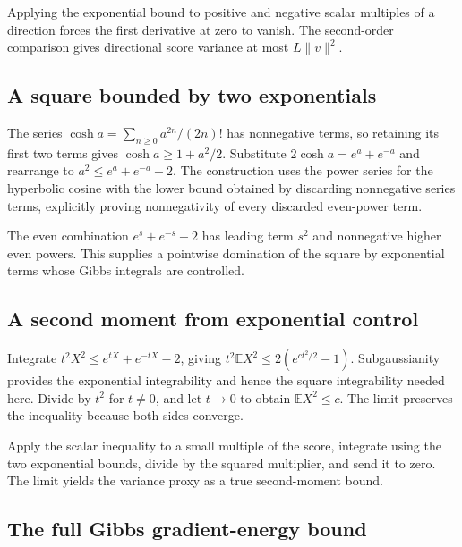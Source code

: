 \documentclass[11pt,a4paper]{article}
\begin{document}
Applying the exponential bound to positive and negative scalar multiples of a direction forces the first derivative at zero to vanish. The second-order comparison gives directional score variance at most \(L\|v\|^2\).


\subsection{\texorpdfstring{A square bounded by two exponentials}{A square bounded by two exponentials}}


The series \(\cosh a=\sum_{n\ge0}a^{2n}/(2n)!\) has nonnegative terms, so retaining its first two terms gives \(\cosh a\ge1+a^2/2\). Substitute \(2\cosh a=e^a+e^{-a}\) and rearrange to \(a^2\le e^a+e^{-a}-2\). The construction uses the power series for the hyperbolic cosine with the lower bound obtained by discarding nonnegative series terms, explicitly proving nonnegativity of every discarded even-power term.



The even combination \(e^s+e^{-s}-2\) has leading term \(s^2\) and nonnegative higher even powers. This supplies a pointwise domination of the square by exponential terms whose Gibbs integrals are controlled.


\subsection{\texorpdfstring{A second moment from exponential control}{A second moment from exponential control}}


Integrate \(t^2X^2\le e^{tX}+e^{-tX}-2\), giving \(t^2\mathbb EX^2\le2(e^{ct^2/2}-1)\). Subgaussianity provides the exponential integrability and hence the square integrability needed here. Divide by \(t^2\) for \(t\ne0\), and let \(t\to0\) to obtain \(\mathbb EX^2\le c\). The limit preserves the inequality because both sides converge.



Apply the scalar inequality to a small multiple of the score, integrate using the two exponential bounds, divide by the squared multiplier, and send it to zero. The limit yields the variance proxy as a true second-moment bound.


\subsection{\texorpdfstring{The full Gibbs gradient-energy bound}{The full Gibbs gradient-energy bound}}
\end{document}
